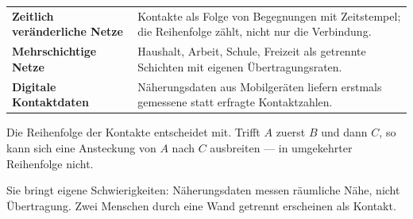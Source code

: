 \begin{forschung}
\begin{center}
{\small
\renewcommand{\arraystretch}{1.45}
\begin{tabular}{@{}P{2.8cm}P{5.4cm}@{}}
\toprule
\textbf{Zeitlich veränderliche Netze} & Kontakte als Folge von Begegnungen mit Zeitstempel; die Reihenfolge zählt, nicht nur die Verbindung.\\
\textbf{Mehrschichtige Netze} & Haushalt, Arbeit, Schule, Freizeit als getrennte Schichten mit eigenen Übertragungsraten.\\
\textbf{Digitale Kontaktdaten} & Näherungsdaten aus Mobilgeräten liefern erstmals gemessene statt erfragte Kontaktzahlen.\\
\bottomrule
\end{tabular}}
\end{center}

Die Reihenfolge der Kontakte entscheidet mit. Trifft $A$ zuerst $B$ und dann $C$, so kann sich eine Ansteckung von $A$ nach $C$ ausbreiten --- in umgekehrter Reihenfolge nicht.

\begin{center}
\begin{minipage}{0.88\textwidth}
\end{minipage}
\end{center}

Sie bringt eigene Schwierigkeiten: Näherungsdaten messen räumliche Nähe, nicht Übertragung. Zwei Menschen durch eine Wand getrennt erscheinen als Kontakt.

\begin{center}
\begin{minipage}{0.88\textwidth}
\end{minipage}
\end{center}
\end{forschung}


